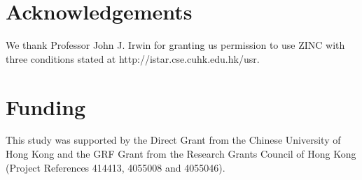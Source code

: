 \documentclass{bioinfo}
\begin{document}
\section*{Acknowledgements}

We thank Professor John J. Irwin for granting us permission to use ZINC with three conditions stated at http://istar.cse.cuhk.edu.hk/usr.

\section*{Funding}

This study was supported by the Direct Grant from the Chinese University of Hong Kong and the GRF Grant from the Research Grants Council of Hong Kong (Project References 414413, 4055008 and 4055046).



\end{document}
